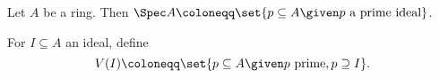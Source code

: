 Let $A $ be a ring. Then $\Spec A\coloneqq \set{p \subseteq A\given p\text{ a prime ideal}}$.

For $I \subseteq A$ an ideal, define
\[ V(I)\coloneqq \set{p \subseteq A\given p\text{ prime}, p\supseteq I}. \]

